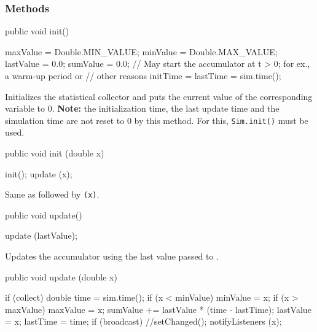 \subsubsection* {Methods}
\begin{code}

   public void init() \begin{hide} {
       maxValue = Double.MIN_VALUE;
       minValue = Double.MAX_VALUE;
       lastValue = 0.0;
       sumValue = 0.0;
       // May start the accumulator at t > 0; for ex., a warm-up period or
       // other reasons
       initTime = lastTime = sim.time();
   } \end{hide}
\end{code}
  \begin{tabb}  Initializes the statistical collector and puts the current
   value of the corresponding variable to 0.
   \textbf{Note:} the initialization time, the last update time and
   the simulation time are not reset to 0 by this method. For this,
   \texttt{Sim.init()} must be used.
 \end{tabb}
\begin{code}

   public void init (double x) \begin{hide} {
       init();  update (x);
   } \end{hide}
\end{code}
  \begin{tabb}  Same as  followed by \texttt{(x)}.
 \end{tabb}
\begin{htmlonly}
\end{htmlonly}
\begin{code}

   public void update()\begin{hide} {
      update (lastValue);
   }\end{hide}
\end{code}
\begin{tabb}  Updates the accumulator using the last value passed
  to .
\end{tabb}
\begin{code}

   public void update (double x) \begin{hide} {
      if (collect) {
         double time = sim.time();
         if (x < minValue) minValue = x;
         if (x > maxValue) maxValue = x;
         sumValue += lastValue * (time - lastTime);
         lastValue = x;
         lastTime = time;
      }
      if (broadcast) {
         //setChanged();
         notifyListeners (x);
      }
   }\end{hide}
\end{code}

